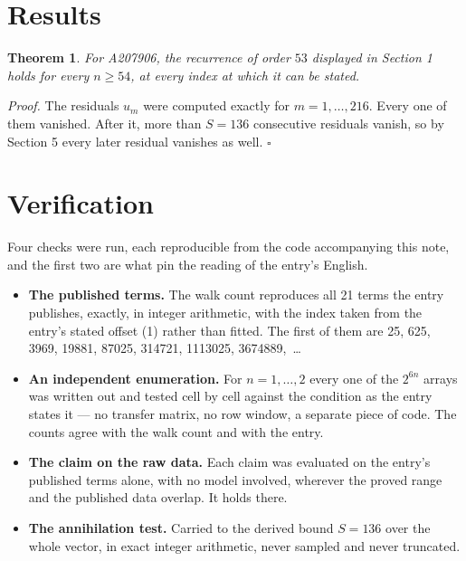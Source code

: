 \documentclass[11pt]{article}
\newtheorem{theorem}{Theorem}
\theoremstyle{definition}
\begin{document}
\section{Results}

\begin{theorem} For A207906, the recurrence of order $53$ displayed in Section 1 holds for every $n \ge 54$, at every index at which it can be stated.\end{theorem}

{\itshape Proof.} The residuals $u_m$ were computed exactly for $m = 1,\dots,216$. Every one of them vanished. After it, more than $S = 136$ consecutive residuals vanish, so by Section 5 every later residual vanishes as well. $\square$

\section{Verification}

Four checks were run, each reproducible from the code accompanying this note, and the first two are what pin the reading of the entry's English.

\begin{itemize}

\item {\bfseries The published terms.} The walk count reproduces all 21 terms the entry publishes, exactly, in integer arithmetic, with the index taken from the entry's stated offset (1) rather than fitted. The first of them are 25, 625, 3969, 19881, 87025, 314721, 1113025, 3674889,~\dots

\item {\bfseries An independent enumeration.} For $n = 1,\dots,2$ every one of the $2^{6n}$ arrays was written out and tested cell by cell against the condition as the entry states it --- no transfer matrix, no row window, a separate piece of code. The counts agree with the walk count and with the entry.

\item {\bfseries The claim on the raw data.} Each claim was evaluated on the entry's published terms alone, with no model involved, wherever the proved range and the published data overlap. It holds there.

\item {\bfseries The annihilation test.} Carried to the derived bound $S = 136$ over the whole vector, in exact integer arithmetic, never sampled and never truncated.

\end{itemize}
\end{document}

